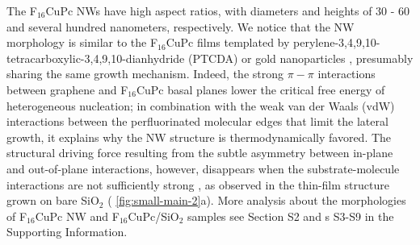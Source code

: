 The F\(_{\text{16}}\)CuPc NWs have high aspect ratios, with diameters
and heights of 30 - 60 and several hundred nanometers,
respectively. We notice that the NW morphology is similar to the
F\(_{\text{16}}\)CuPc films templated by
perylene-3,4,9,10-tetracarboxylic-3,4,9,10-dianhydride (PTCDA)
\cite{Yang_2009_F16_PTCDA} or gold nanoparticles
\cite{Mbenkum_2006_F16_1D}, presumably sharing the same growth
mechanism. Indeed, the strong \(\pi-\pi\) interactions between
graphene and F\(_{\text{16}}\)CuPc basal planes lower the critical
free energy of heterogeneous nucleation; in combination with the weak
van der Waals (vdW) interactions between the perfluorinated molecular
edges that limit the lateral growth, it explains why the NW structure
is thermodynamically favored. The structural driving force resulting
from the subtle asymmetry between in-plane and out-of-plane
interactions, however, disappears when the substrate-molecule
interactions are not sufficiently strong ,
as observed in the thin-film structure grown on bare
SiO\(_{\text{2}}\) ( \autoref{fig:small-main-2}a). More analysis about the
morphologies of F\(_{\text{16}}\)CuPc NW and
F\(_{\text{16}}\)CuPc/SiO\(_{\text{2}}\) samples see Section S2 and
s S3-S9 in the Supporting Information.

